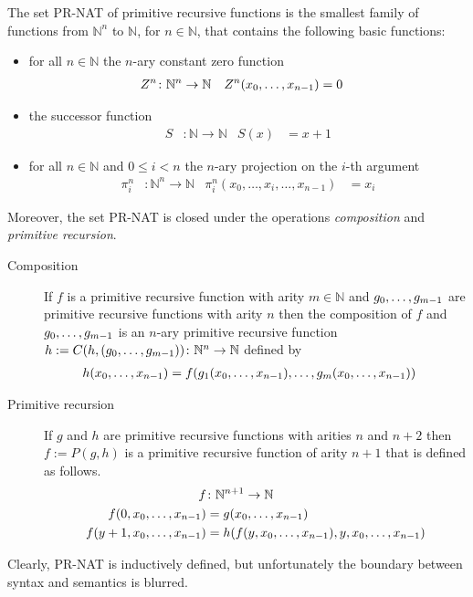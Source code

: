\documentclass[a4paper,USenglish,cleveref, autoref, thm-restate]{lipics-v2021}
\begin{document}
The set PR-NAT of primitive recursive functions is the smallest family of functions
from ${ℕ}^n$  to ${ℕ}$, for $n\in {ℕ}$, that contains the following
basic functions:
\begin{itemize}
\item for all $n\in {ℕ}$ the $n$-ary constant zero function
  \begin{align*}
	Z^n  &\colon \mathbb{N}^n \rightarrow \mathbb{N}  &
	Z^n    ({x}_0,\dots,{x}_{n-1}) &= 0  
  \end{align*}
\item the successor function
  \begin{align*}
	S &\colon \mathbb{N} \rightarrow \mathbb{N} &
	S  (x)  &=  x + 1
  \end{align*}
\item for all $n\in {ℕ}$ and $0\le i< n$ the $n$-ary projection on
  the $i$-th argument
\begin{align*}
	\pi^{n}_{i} &\colon \mathbb{N}^n \rightarrow \mathbb{N} &
	\pi^{n}_{i}  (x_0,\dots,x_i,\dots,x_{n-1})  &= x_i
\end{align*}
\end{itemize}
Moreover, the set PR-NAT is closed under the operations \emph{composition} and \emph{primitive recursion}.
\begin{description}
\item[Composition] 
If $f$ is a primitive recursive function with arity $m \in {ℕ}$ and
${g}_0,\dots,{g}_{m-1}$ are primitive recursive functions with arity $n$ then
the composition of $f$ and ${g}_0,\dots,{g}_{m-1}$ is an $n$-ary primitive recursive function
$h := C (h,({g}_0,\dots,{g}_{m-1})) \colon \mathbb{N}^n \rightarrow \mathbb{N} $ defined by
\begin{align*}
	h  ({x}_0,\dots,{x}_{n-1})  &= f (g_1({x}_0,\dots,{x}_{n-1}),\dots,g_m({x}_0,\dots,{x}_{n-1})) 
\end{align*}

\item[Primitive recursion] 
If $g$ and $h$ are primitive recursive functions with arities $n$ and
$n+2$ then $f := P (g,h)$ is a primitive recursive function of arity $n+1$ that is defined as follows.
\begin{align*}
	f&\colon \mathbb{N}^{n+1} \rightarrow \mathbb{N} \\
	f  (0,{x}_0,\dots,{x}_{n-1})  &= g ({x}_0,\dots,{x}_{n-1}) \\
	f  (y + 1,{x}_0,\dots,{x}_{n-1}) &= h(  f(y,{x}_0,\dots,{x}_{n-1}),y,{x}_0,\dots,{x}_{n-1})
\end{align*}

\end{description}

Clearly, PR-NAT is inductively defined, but unfortunately the boundary
between syntax and semantics is blurred.
\end{document}
